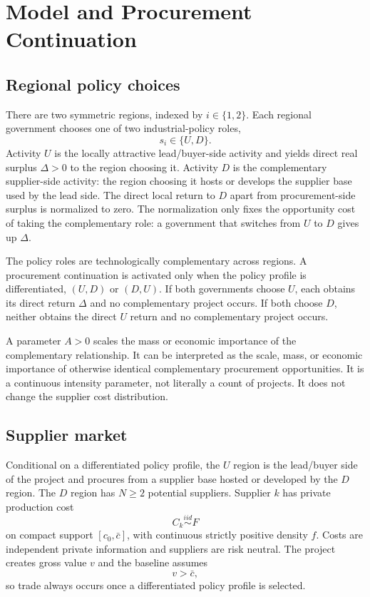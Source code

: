 \section{Model and Procurement Continuation}
\label{sec:model}

\subsection{Regional policy choices}

There are two symmetric regions, indexed by $i\in\{1,2\}$. Each regional government chooses one of two industrial-policy roles,
\begin{equation}
s_i\in\{U,D\}.
\end{equation}
Activity $U$ is the locally attractive lead/buyer-side activity and yields direct real surplus $\Delta>0$ to the region choosing it. Activity $D$ is the complementary supplier-side activity: the region choosing it hosts or develops the supplier base used by the lead side. The direct local return to $D$ apart from procurement-side surplus is normalized to zero. The normalization only fixes the opportunity cost of taking the complementary role: a government that switches from $U$ to $D$ gives up $\Delta$.

The policy roles are technologically complementary across regions. A procurement continuation is activated only when the policy profile is differentiated, $(U,D)$ or $(D,U)$. If both governments choose $U$, each obtains its direct return $\Delta$ and no complementary project occurs. If both choose $D$, neither obtains the direct $U$ return and no complementary project occurs.

A parameter $A>0$ scales the mass or economic importance of the complementary relationship. It can be interpreted as the scale, mass, or economic importance of otherwise identical complementary procurement opportunities. It is a continuous intensity parameter, not literally a count of projects. It does not change the supplier cost distribution.

\subsection{Supplier market}

Conditional on a differentiated policy profile, the $U$ region is the lead/buyer side of the project and procures from a supplier base hosted or developed by the $D$ region. The $D$ region has $N\ge2$ potential suppliers. Supplier $k$ has private production cost
\begin{equation}
C_k\overset{iid}{\sim}F
\end{equation}
on compact support $[c_0,\bar c]$, with continuous strictly positive density $f$. Costs are independent private information and suppliers are risk neutral. The project creates gross value $v$ and the baseline assumes
\begin{equation}
v>\bar c,
\label{eq:guaranteed-trade}
\end{equation}
so trade always occurs once a differentiated policy profile is selected.

